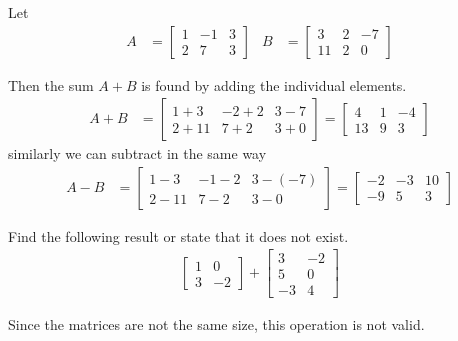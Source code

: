 \bigskip
\begin{example}
Let
%
\begin{align*}
A & = \begin{bmatrix}
1 & -1 & 3 \\
2 & 7 & 3
\end{bmatrix} &
B & = \begin{bmatrix}
3 & 2 & -7 \\ 11 & 2 & 0
\end{bmatrix}
\end{align*}

Then the sum $A+B$ is found by adding the individual elements.
%
\begin{align*}
A+B & = \begin{bmatrix}
1+3 & -2+2 & 3-7\\ 2+11 & 7+2 & 3+0
\end{bmatrix}= \begin{bmatrix}
4 & 1 & -4 \\ 13 & 9 & 3
\end{bmatrix}
\end{align*}
similarly we can subtract in the same way
\begin{align*}
A-B & =
\begin{bmatrix}
1-3 & -1-2 & 3-(-7)\\
2-11 & 7-2 & 3-0
\end{bmatrix}=
\begin{bmatrix}
-2 & -3 & 10 \\
-9 & 5 & 3
\end{bmatrix}
\end{align*}

\end{example}


\begin{example}
 Find the following result or state that it does not exist.
\begin{align*}
\begin{bmatrix}
 1 & 0 \\ 3 & -2
\end{bmatrix} +
\begin{bmatrix}
 3 & -2 \\
 5 & 0 \\
 -3 & 4
\end{bmatrix}
\end{align*}

\solution

Since the matrices are not the same size, this operation is not valid.

\end{example}

